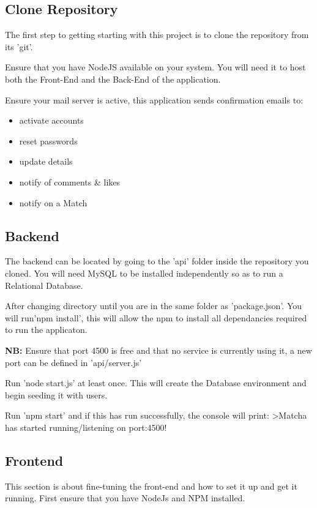 \subsection{Clone Repository}

The first step to getting starting with this project is to clone the 
repository from its 'git'.

Ensure that you have NodeJS available on your system. You will
need it to host both the Front-End and the Back-End of the application.

Ensure your mail server is active, this application sends confirmation
emails to:
\begin{itemize}
    \item activate accounts
    \item reset passwords
    \item update details
    \item notify of comments \& likes
    \item notify on a Match
\end{itemize}

\subsection{Backend}

The backend can be located by going to the 'api' folder inside the
repository you cloned. You will need MySQL to be installed
independently so as to run a Relational Database.

After changing directory until you are in the same folder as 'package.json'. You will run'npm install',
this will allow the npm to install all dependancies required to run the applicaton.

\textbf{NB:} Ensure that port 4500 is free and that no service is currently using it, a new port
can be defined in 'api/server.js'

Run 'node start.js' at least once. This will create the Database environment
and begin seeding it with users.

Run 'npm start' and if this has run successfully, the console
will print:
    >Matcha has started running/listening on port:4500!

\subsection{Frontend}

This section is about fine-tuning the front-end and how to set it up and get it running.
First ensure that you have NodeJs and NPM installed.


